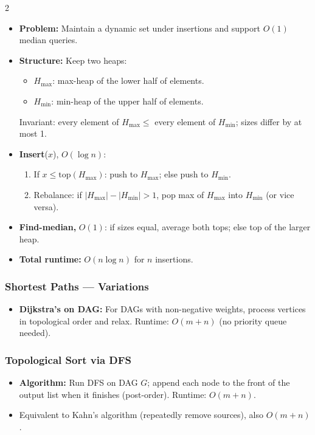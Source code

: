 \documentclass[9pt]{article}
\begin{document}
\begin{multicols}{2}
\begin{itemize}
  \item \textbf{Problem:} Maintain a dynamic set under insertions and support $O(1)$ median queries.
  \item \textbf{Structure:} Keep two heaps:
  \begin{itemize}
    \item $H_{\max}$: max-heap of the lower half of elements.
    \item $H_{\min}$: min-heap of the upper half of elements.
  \end{itemize}
  Invariant: every element of $H_{\max}\le$ every element of $H_{\min}$; sizes differ by at most 1.
  \item \textbf{Insert}($x$), $O(\log n)$:
  \begin{enumerate}
    \item If $x\le\mathrm{top}(H_{\max})$: push to $H_{\max}$; else push to $H_{\min}$.
    \item Rebalance: if $|H_{\max}|-|H_{\min}|>1$, pop max of $H_{\max}$ into $H_{\min}$ (or vice versa).
  \end{enumerate}
  \item \textbf{Find-median,} $O(1)$: if sizes equal, average both tops; else top of the larger heap.
  \item \textbf{Total runtime:} $O(n\log n)$ for $n$ insertions.
\end{itemize}

\subsubsection*{Shortest Paths — Variations}

\begin{itemize}
  \item \textbf{Dijkstra's on DAG:} For DAGs with non-negative weights, process vertices in topological order and relax. Runtime: $O(m+n)$ (no priority queue needed).
\end{itemize}

\subsubsection*{Topological Sort via DFS}

\begin{itemize}
  \item \textbf{Algorithm:} Run DFS on DAG $G$; append each node to the front of the output list when it finishes (post-order). Runtime: $O(m+n)$.
  \item Equivalent to Kahn's algorithm (repeatedly remove sources), also $O(m+n)$.
\end{itemize}


\end{multicols}
\end{document}
